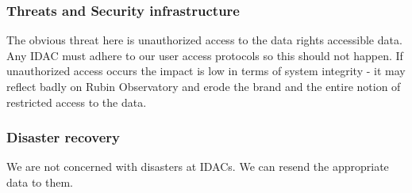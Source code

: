 \subsubsection{Threats and Security infrastructure}
The obvious threat here is unauthorized access to the data rights accessible data.
Any \gls{IDAC} must adhere to our user access protocols so this should not happen.
If unauthorized access occurs the impact is low in terms of system integrity - it may reflect badly on Rubin Observatory and erode the brand and the entire notion of restricted access to the data.

\subsubsection{Disaster recovery}
We are not concerned with disasters at IDACs.
We can resend the appropriate data to them.
